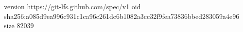 version https://git-lfs.github.com/spec/v1
oid sha256:a085d9ea996c931c1ca96c261dc6b1082a3cc32f9fea73836bbed283059a4e96
size 82039
